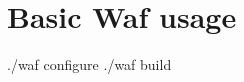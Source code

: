\chapter{Basic Waf usage}
\label{chap:waf}

\begin{lstbash}
./waf configure
./waf build
\end{lstbash}

